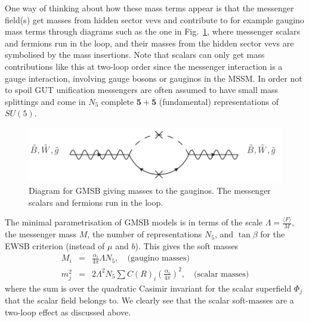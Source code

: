 \documentclass[notes.tex]{subfiles}
\begin{document}
One way of thinking about how these mass terms appear is that the messenger field(s) get masses from hidden sector vevs and contribute to for example gaugino mass terms through diagrams such as the one in Fig.~\ref{fig:GMSB}, where messenger scalars and fermions run in the loop, and their masses from the hidden sector vevs are symbolised by the mass insertions. Note that scalars can only get mass contributions like this at two-loop order since the messenger interaction is a gauge interaction, involving gauge bosons or gauginos in the MSSM. In order not to spoil GUT unification messengers are often assumed to have small mass splittings and come in $N_5$ complete $\mathbf{5} + \overline{\mathbf{5}}$ (fundamental) representations of $SU(5)$.

\begin{figure}[h!]
\begin{center}
\includegraphics[scale=0.8]{figures/GMSB} 
\caption{Diagram for GMSB giving masses to the gauginos. The messenger scalars and fermions run in the loop.\label{fig:GMSB}}
\end{center}
\end{figure}

The minimal parametrisation of GMSB models is in terms of the scale $\Lambda = \frac{\langle F\rangle}{M}$, the messenger mass $M$, the number of representations $N_5$, and $\tan\beta$ for the EWSB criterion (instead of $\mu$ and $b$). This gives the soft masses
\begin{eqnarray}
M_i &=& \frac{\alpha_i}{4\pi}\Lambda N_5,\quad\text{(gaugino masses)}\label{eq:GMSBgauginomass}\\
m_j^2 &=& 2\Lambda^2 N_5 \sum C(R)_i\left(\frac{\alpha_i}{4\pi}\right)^2,\quad\text{(scalar masses)}
\end{eqnarray}
where the sum is over the quadratic Casimir invariant for the scalar superfield $\Phi_j$ that the scalar field belongs to. We clearly see that the scalar soft-masses are a two-loop effect as discussed above. 
\end{document}
